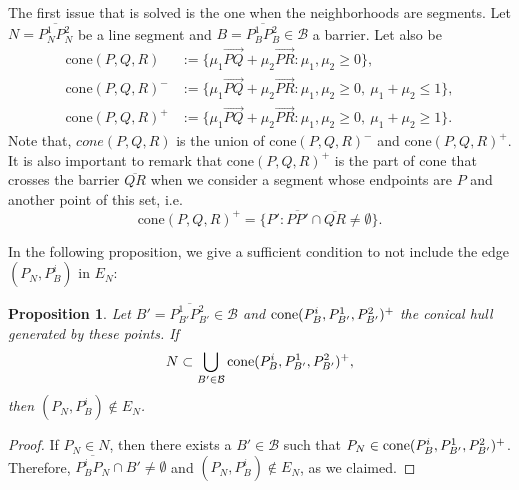 \documentclass[a4paper]{elsarticle}
\newtheorem{prop}{Proposition}
\begin{document}
The first issue that is solved is the one when the neighborhoods are segments. Let $N = \overline{P^1_N P^2_N}$ be a line segment and $B = \overline{P^1_BP^2_B}\in\mathcal B$ a barrier. Let also be
\begin{align*}
\text{cone}(P,Q,R)&:=\{\mu_1 \overrightarrow{PQ}+\mu_2\overrightarrow{PR}:\mu_1,\mu_2\geq 0\},\\
\text{cone}(P,Q,R)^-&:=\{\mu_1 \overrightarrow{PQ}+\mu_2\overrightarrow{PR}:\mu_1,\mu_2\geq 0,\:\mu_1+\mu_2\leq 1\},\\
\text{cone}(P,Q,R)^+&:=\{\mu_1 \overrightarrow{PQ}+\mu_2\overrightarrow{PR}:\mu_1,\mu_2\geq 0,\:\mu_1+\mu_2\geq 1\}.
\end{align*}
Note that, $cone(P, Q, R)$ is the union of $\text{cone}(P,Q,R)^-$ and $\text{cone}(P,Q,R)^+$. It is also important to remark that $\text{cone}(P,Q,R)^+$ is the part of cone that crosses the barrier $\overline{QR}$ when we consider a segment whose endpoints are $P$ and another point of this set, i.e.
$$\text{cone}(P,Q,R)^+=\{P':\overline{PP'}\cap\overline{QR}\neq\emptyset\}.$$

In the following proposition, we give a sufficient condition to not include the edge $(P^{}_N, P^i_B)$ in $E_N$:

\begin{prop}

Let $B'=\overline{P^1_{B'}P^2_{B'}}\in\mathcal B$ and $\normalfont{\text{cone}}(P^i_B, P^1_{B'}, P^2_{B'})^+$ the conical hull generated by these points. If
$$N\subset\bigcup_{B'\in\mathcal B}\normalfont{\text{cone}}(P^i_B, P^1_{B'}, P^2_{B'})^+,$$
then $(P^{}_N, P^i_B)\not\in E_N$.

\end{prop}
\begin{proof}
If $P_N\in N$, then there exists a $B'\in\mathcal B$ such that 
$P_N\in \normalfont{\text{cone}}(P^i_B, P^1_{B'}, P^2_{B'})^+$. Therefore, $\overline{P^i_B P^{}_N}\cap B'\neq\emptyset$ and $(P^{}_N, P^i_B)\not\in E_N$, as we claimed.
\end{proof}
\end{document}
